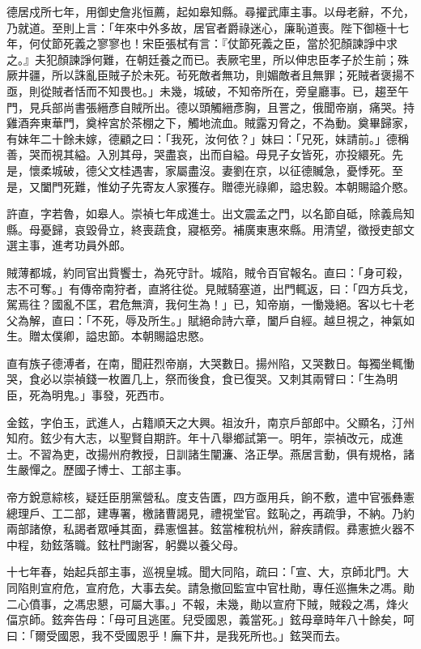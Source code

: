 \begin{pinyinscope}
德居戍所七年，用御史詹兆恒薦，起如皋知縣。尋擢武庫主事。以母老辭，不允，乃就道。至則上言：「年來中外多故，居官者爵祿迷心，廉恥道喪。陛下御極十七年，何仗節死義之寥寥也！宋臣張栻有言：『仗節死義之臣，當於犯顏諫諍中求之。』夫犯顏諫諍何難，在朝廷養之而已。表厥宅里，所以伸忠臣孝子於生前；殊厥井疆，所以誅亂臣賊子於未死。茍死敵者無功，則媚敵者且無罪；死賊者褒揚不亟，則從賊者恬而不知畏也。」未幾，城破，不知帝所在，旁皇廳事。已，趨至午門，見兵部尚書張縉彥自賊所出。德以頭觸縉彥胸，且詈之，俄聞帝崩，痛哭。持雞酒奔東華門，奠梓宮於茶棚之下，觸地流血。賊露刃脅之，不為動。奠畢歸家，有妹年二十餘未嫁，德顧之曰：「我死，汝何依？」妹曰：「兄死，妹請前。」德稱善，哭而視其縊。入別其母，哭盡哀，出而自縊。母見子女皆死，亦投繯死。先是，懷柔城破，德父文桂遇害，家屬盡沒。妻劉在京，以征德贓急，憂悸死。至是，又闔門死難，惟幼子先寄友人家獲存。贈德光祿卿，謚忠毅。本朝賜謚介愍。

許直，字若魯，如皋人。崇禎七年成進士。出文震孟之門，以名節自砥，除義烏知縣。母憂歸，哀毀骨立，終喪蔬食，寢柩旁。補廣東惠來縣。用清望，徵授吏部文選主事，進考功員外郎。

賊薄都城，約同官出貲饗士，為死守計。城陷，賊令百官報名。直曰：「身可殺，志不可奪。」有傳帝南狩者，直將往從。見賊騎塞道，出門輒返，曰：「四方兵戈，駕焉往？國亂不匡，君危無濟，我何生為！」已，知帝崩，一慟幾絕。客以七十老父為解，直曰：「不死，辱及所生。」賦絕命詩六章，闔戶自經。越旦視之，神氣如生。贈太僕卿，謚忠節。本朝賜謚忠愍。

直有族子德溥者，在南，聞莊烈帝崩，大哭數日。揚州陷，又哭數日。每獨坐輒慟哭，食必以崇禎錢一枚置几上，祭而後食，食已復哭。又刺其兩臂曰：「生為明臣，死為明鬼。」事發，死西市。

金鉉，字伯玉，武進人，占籍順天之大興。祖汝升，南京戶部郎中。父顯名，汀州知府。鉉少有大志，以聖賢自期許。年十八舉鄉試第一。明年，崇禎改元，成進士。不習為吏，改揚州府教授，日訓諸生闡濂、洛正學。燕居言動，俱有規格，諸生嚴憚之。歷國子博士、工部主事。

帝方銳意綜核，疑廷臣朋黨營私。度支告匱，四方亟用兵，餉不敷，遣中官張彝憲總理戶、工二部，建專署，檄諸曹謁見，禮視堂官。鉉恥之，再疏爭，不納。乃約兩部諸僚，私謁者眾唾其面，彞憲慍甚。鉉當榷稅杭州，辭疾請假。彞憲摭火器不中程，劾鉉落職。鉉杜門謝客，躬爨以養父母。

十七年春，始起兵部主事，巡視皇城。聞大同陷，疏曰：「宣、大，京師北門。大同陷則宣府危，宣府危，大事去矣。請急撤回監宣中官杜勛，專任巡撫朱之馮。勛二心僨事，之馮忠懇，可屬大事。」不報，未幾，勛以宣府下賊，賊殺之馮，烽火偪京師。鉉奔告母：「母可且逃匿。兒受國恩，義當死。」鉉母章時年八十餘矣，呵曰：「爾受國恩，我不受國恩乎！廡下井，是我死所也。」鉉哭而去。


\end{pinyinscope}
